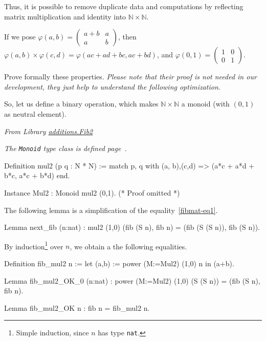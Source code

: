 Thus, it is possible to remove duplicate data and computations by reflecting matrix multiplication and identity into $\mathbb{N}\times\mathbb{N}$.

If we pose $\varphi(a,b) =\left(
  \begin{array}{cc}
    a+b  & a \\
    a & b
  \end{array}
\right)$, then $\varphi(a,b)\times \varphi(c,d)=\varphi(ac + ad + bc, ac + bd)$, and
$\varphi(0,1)=  \left(
  \begin{array}{cc}
    1 & 0 \\
    0 & 1 
  \end{array}
\right) $.

\begin{exercise}
  Prove formally these properties. \emph{Please note that their proof is not needed in our development, they just help to understand the following optimization.}
\end{exercise}


So, let us define a binary operation, which makes $\mathbb{N}\times\mathbb{N}$ a monoid (with $(0,1)$ as neutral element).


\emph{From Library
\href{../theories/html/additions.Fib2.html}{additions.Fib2}} 

\emph{The \texttt{Monoid} type class is defined 
page~\pageref{sect:monoid-def}.}

\begin{Coqsrc}
Definition mul2 (p q : N * N) :=
  match p, q with (a, b),(c,d) => (a*c + a*d + b*c, a*c + b*d) end.

Instance Mul2 : Monoid  mul2 (0,1).
(* Proof omitted *)
\end{Coqsrc}

The following lemma is a simplification of the equality~\vref{fibmat-eq1}.

\begin{Coqsrc}
Lemma next_fib (n:nat) : mul2 (1,0) (fib (S n), fib n) =
                         (fib (S (S n)), fib (S n)).  
\end{Coqsrc}

By induction\footnote{Simple induction, since $n$ has type \texttt{nat}.}
 over $n$, we obtain a the following equalities.

\begin{Coqsrc}
Definition fib_mul2 n := let (a,b) := power (M:=Mul2) (1,0) n   in (a+b).

Lemma fib_mul2_OK_0 (n:nat) : power (M:=Mul2) (1,0) (S (S n)) =
                              (fib (S n), fib n).

Lemma fib_mul2_OK n : fib n = fib_mul2 n.
\end{Coqsrc}

